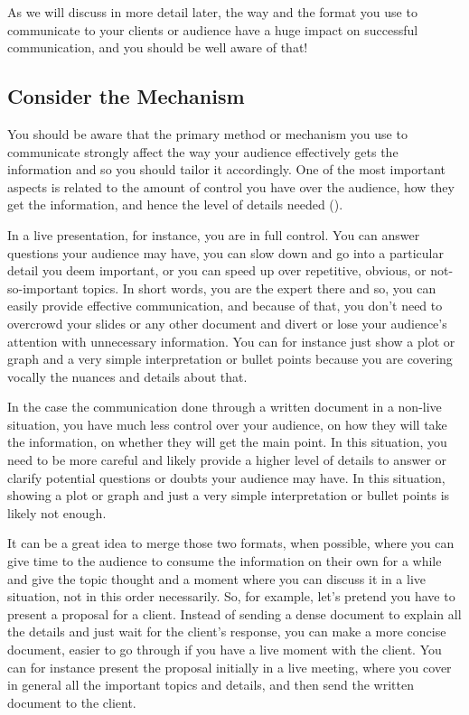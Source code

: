 \documentclass[
]{krantz}
\begin{document}
As we will discuss in more detail later, the way and the format you use to communicate to your clients or audience have a huge impact on successful communication, and you should be well aware of that!

\hypertarget{consider-the-mechanism}{%
\subsection{Consider the Mechanism}\label{consider-the-mechanism}}

You should be aware that the primary method or mechanism you use to communicate strongly affect the way your audience effectively gets the information and so you should tailor it accordingly. One of the most important aspects is related to the amount of control you have over the audience, how they get the information, and hence the level of details needed (\citet{Knaflic2015}).

In a live presentation, for instance, you are in full control. You can answer questions your audience may have, you can slow down and go into a particular detail you deem important, or you can speed up over repetitive, obvious, or not-so-important topics. In short words, you are the expert there and so, you can easily provide effective communication, and because of that, you don't need to overcrowd your slides or any other document and divert or lose your audience's attention with unnecessary information. You can for instance just show a plot or graph and a very simple interpretation or bullet points because you are covering vocally the nuances and details about that.

In the case the communication done through a written document in a non-live situation, you have much less control over your audience, on how they will take the information, on whether they will get the main point. In this situation, you need to be more careful and likely provide a higher level of details to answer or clarify potential questions or doubts your audience may have. In this situation, showing a plot or graph and just a very simple interpretation or bullet points is likely not enough.

It can be a great idea to merge those two formats, when possible, where you can give time to the audience to consume the information on their own for a while and give the topic thought and a moment where you can discuss it in a live situation, not in this order necessarily. So, for example, let's pretend you have to present a proposal for a client. Instead of sending a dense document to explain all the details and just wait for the client's response, you can make a more concise document, easier to go through if you have a live moment with the client. You can for instance present the proposal initially in a live meeting, where you cover in general all the important topics and details, and then send the written document to the client.
\end{document}

